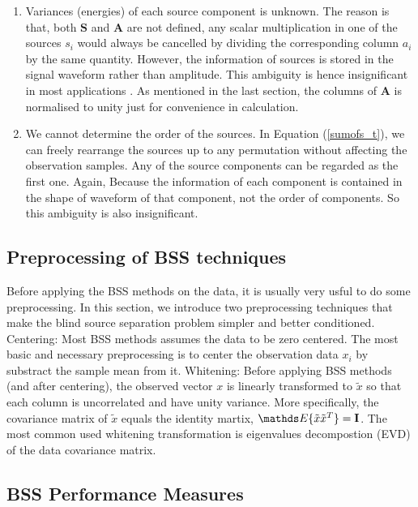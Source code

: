 \begin{enumerate}
    \item Variances (energies) of each source component is unknown. The reason is that, both $\mathbf{S}$ and $\mathbf{A}$ are not defined, any scalar multiplication in one of the sources $s_i$ would always be cancelled by dividing the corresponding column $a_i$ by the same quantity. However, the information of sources is stored in the signal waveform rather than amplitude. This ambiguity is hence insignificant in most applications \cite{HYVARINEN2000411}. 
    As mentioned in the last section, the columns of $\mathbf{A}$ is normalised to unity just for convenience in calculation.
    \item We cannot determine the order of the sources. In Equation (\ref{sumofs_t}), we can freely rearrange the sources up to any permutation without affecting the observation samples. Any of the source components can be regarded as the first one. Again, Because the information of each component is contained in the shape of waveform of that component, not the order of components. So this ambiguity is also insignificant.
\end{enumerate}



\subsection{Preprocessing of BSS techniques}
Before applying the BSS methods on the data, it is usually very usful to do some preprocessing. In this section, we introduce two preprocessing techniques that make the blind source separation problem simpler and better conditioned.
Centering:
Most BSS methods assumes the data to be zero centered. The most basic and necessary preprocessing is to center the observation data $x_i$ by substract the sample mean from it. 
Whitening:
Before applying BSS methods (and after centering), the observed vector $x$ is linearly transformed to $\tilde{x}$ so that each column is uncorrelated and have unity variance. More specifically, the covariance matrix of $\tilde{x}$ equals the identity martix, $\E\{\tilde{x}\tilde{x}^T\} = \mathbf{I}$. The most common used whitening transformation is eigenvalues decompostion (EVD) of the data covariance matrix.

\subsection{BSS Performance Measures}
\label{perform_metric}

